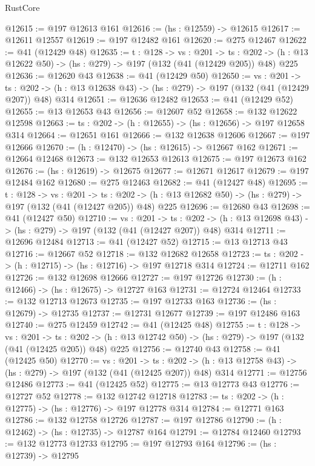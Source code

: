 \begin{lexlean}{RustCore}
\begin{coremodule}
@12615 := @197 @12613 @161
@12616 := (hs : @12559) -> @12615
@12617 := @12611 @12557
@12619 := @197 @12482 @161
@12620 := @275 @12467
@12622 := @41 (@12429 @48)
@12635 := {t : @128} ->
  {vs : @201} ->
  {ts : @202} -> (h : @13 @12622 @50) -> (hs : @279) -> @197 (@132 (@41 (@12429 @205)) @48) @225
@12636 := @12620 @43
@12638 := @41 (@12429 @50)
@12650 := {vs : @201} ->
  {ts : @202} -> (h : @13 @12638 @43) -> (hs : @279) -> @197 (@132 (@41 (@12429 @207)) @48) @314
@12651 := @12636 @12482
@12653 := @41 (@12429 @52)
@12655 := @13 @12653 @43
@12656 := @12607 @52
@12658 := @132 @12622 @12598
@12663 := {ts : @202} -> (h : @12655) -> (hs : @12656) -> @197 @12658 @314
@12664 := @12651 @161
@12666 := @132 @12638 @12606
@12667 := @197 @12666
@12670 := (h : @12470) -> (hs : @12615) -> @12667 @162
@12671 := @12664 @12468
@12673 := @132 @12653 @12613
@12675 := @197 @12673 @162
@12676 := (hs : @12619) -> @12675
@12677 := @12671 @12617
@12679 := @197 @12484 @162
@12680 := @275 @12463
@12682 := @41 (@12427 @48)
@12695 := {t : @128} ->
  {vs : @201} ->
  {ts : @202} -> (h : @13 @12682 @50) -> (hs : @279) -> @197 (@132 (@41 (@12427 @205)) @48) @225
@12696 := @12680 @43
@12698 := @41 (@12427 @50)
@12710 := {vs : @201} ->
  {ts : @202} -> (h : @13 @12698 @43) -> (hs : @279) -> @197 (@132 (@41 (@12427 @207)) @48) @314
@12711 := @12696 @12484
@12713 := @41 (@12427 @52)
@12715 := @13 @12713 @43
@12716 := @12667 @52
@12718 := @132 @12682 @12658
@12723 := {ts : @202} -> (h : @12715) -> (hs : @12716) -> @197 @12718 @314
@12724 := @12711 @162
@12726 := @132 @12698 @12666
@12727 := @197 @12726
@12730 := (h : @12466) -> (hs : @12675) -> @12727 @163
@12731 := @12724 @12464
@12733 := @132 @12713 @12673
@12735 := @197 @12733 @163
@12736 := (hs : @12679) -> @12735
@12737 := @12731 @12677
@12739 := @197 @12486 @163
@12740 := @275 @12459
@12742 := @41 (@12425 @48)
@12755 := {t : @128} ->
  {vs : @201} ->
  {ts : @202} -> (h : @13 @12742 @50) -> (hs : @279) -> @197 (@132 (@41 (@12425 @205)) @48) @225
@12756 := @12740 @43
@12758 := @41 (@12425 @50)
@12770 := {vs : @201} ->
  {ts : @202} -> (h : @13 @12758 @43) -> (hs : @279) -> @197 (@132 (@41 (@12425 @207)) @48) @314
@12771 := @12756 @12486
@12773 := @41 (@12425 @52)
@12775 := @13 @12773 @43
@12776 := @12727 @52
@12778 := @132 @12742 @12718
@12783 := {ts : @202} -> (h : @12775) -> (hs : @12776) -> @197 @12778 @314
@12784 := @12771 @163
@12786 := @132 @12758 @12726
@12787 := @197 @12786
@12790 := (h : @12462) -> (hs : @12735) -> @12787 @164
@12791 := @12784 @12460
@12793 := @132 @12773 @12733
@12795 := @197 @12793 @164
@12796 := (hs : @12739) -> @12795

\end{coremodule}
\end{lexlean}
